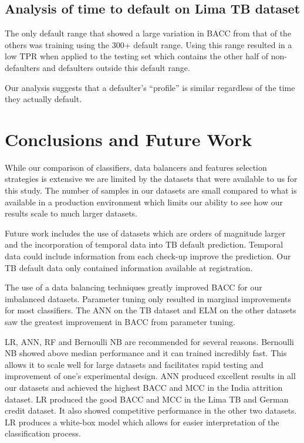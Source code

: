 \documentclass{sig-alternate-05-2015}
\begin{document}
	\subsection{Analysis of time to default on Lima TB dataset}
	The only default range that showed a large variation in BACC from that of the others was training using the 300+ default range. Using this range resulted in a low TPR when applied to the testing set which contains the other half of non-defaulters and defaulters outside this default range. 
	
	Our analysis suggests that a defaulter's ``profile'' is similar regardless of the time they actually default.	
	
	\section{Conclusions and Future Work}
	While our comparison of classifiers, data balancers and features selection strategies is extensive we are limited by the datasets that were available to us for this study. The number of samples in our datasets are small compared to what is available in a production environment which limits our ability to see how our results scale to much larger datasets.
	
	Future work includes the use of datasets which are orders of magnitude larger and the incorporation of temporal data into TB default prediction. Temporal data could include information from each check-up improve the prediction. Our TB default data only contained information available at registration.
	
	The use of a data balancing techniques greatly improved BACC for our imbalanced datasets. Parameter tuning only resulted in marginal improvements for most classifiers. The ANN on the TB dataset and ELM on the other datasets saw the greatest improvement in BACC from parameter tuning.
	
	LR, ANN, RF and Bernoulli NB are recommended for several reasons. Bernoulli NB showed above median performance and it can trained incredibly fast. This allows it to scale well for large datasets and facilitates rapid testing and improvement of one's experimental design. ANN produced excellent results in all our datasets and achieved the highest BACC and MCC in the India attrition dataset. LR produced the good BACC and MCC in the Lima TB and German credit dataset. It also showed competitive performance in the other two datasets. LR produces a white-box model which allows for easier interpretation of the classification process.
	
\end{document}
